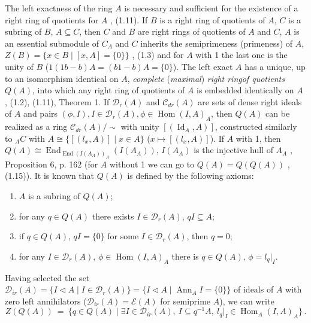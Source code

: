 \documentclass[a4paper,11pt]{article}
\DeclareMathOperator{\Id}{Id}
\DeclareMathOperator{\Hom}{Hom}
\DeclareMathOperator{\End}{End}
\DeclareMathOperator{\Ann}{Ann}
\begin{document}
The left exactness of the ring $A$ is necessary and sufficient for the existence of 
a right ring of quotients for $A$ \cite{Ut}, (1.11). If $B$ is a right 
ring of quotients of $A$, $C$ is a subring of $B$, ${A\subseteq C}$, then 
$C$ and $B$ are right rings of quotients of $A$ and $C$, $A$ is an essential 
submodule of $C_A$ and $C$ inherits the semiprimeness (primeness) of $A$, 
${Z(B)=\{x\in B\mid [x, A]=\{0\}\}}$ \cite{Ut}, (1.3) and for $A$ with 1 
the last one is the unity of $B$ (${1 (1 b-b) A=(b 1-b) A=\{0\}}$). The left 
exact $A$ has a unique, up to an isomorphism identical on $A$, \emph{complete} 
(\emph{maximal}) \emph{right ring\linebreak of quotients} $Q(A)$, into which any right 
ring of quotients of $A$ is embedded identically on $A$ 
\cite{Ut}, (1.2), (1.11), Theorem 1.
If $\mathcal{D}_r(A)$ and $\mathcal{C}_{dr}(A)$ are sets of dense right ideals 
of $A$ and pairs ${(\phi, I), I\in \mathcal{D}_r(A), \phi\in \Hom(I, A)_A}$, 
then $Q(A)$ can be realized as a ring ${\mathcal{C}_{dr}(A)/\sim}$ with unity 
${[(\Id_A, A)]}$, constructed similarly to ${}_A C$ with 
${A\cong \{[(l_x, A)]\mid x\in A\}}$ (${x\longmapsto [(l_x, A)]}$). If $A$ with 
1, then ${Q(A)\cong \End_{\End(I(A_A))_A}(I(A_A))}$, $I(A_A)$ is the injective 
hull of $A_A$ \cite{Lamb}, Proposition 6, p. 162 (for $A$ without 1 we can 
go to ${Q(A)=Q(Q(A))}$ \cite{Ut}, (1.15)). It is known that $Q(A)$ is 
defined by the following axioms:
\begin{enumerate}

\item $A$ is a subring of $Q(A)$; 

\item for any ${q\in Q(A)}$ there exists ${I\in \mathcal{D}_r(A)}$, 
${q I\subseteq A}$;

\item if ${q\in Q(A)}$, ${q I=\{0\}}$ for some ${I\in \mathcal{D}_r(A)}$, 
then ${q=0}$;

\item for any ${I\in \mathcal{D}_r(A)}$, ${\phi\in \Hom(I, A)_A}$ there 
is ${q\in Q(A)}$, ${\phi=l_q|_I}$.

\end{enumerate}
Having selected the set ${\mathcal{D}_{ir}(A)=\{I\lhd A\mid I\in \mathcal{D}_r(A)\}=
\{I\lhd A\mid \Ann_A I=\{0\}\}}$ of ideals of $A$ with zero left annihilators 
(${\mathcal{D}_{ir}(A)=\mathcal{E}(A)}$ for semiprime $A$), we can write
\[
Z(Q(A))\ =\ \{q\in Q(A)\mid \exists I\in \mathcal{D}_{ir}(A),\ 
I\subseteq q^{-1} A,\ l_q|_I\in \Hom_A(I, A)_A\}\,. 
\]
\end{document}
